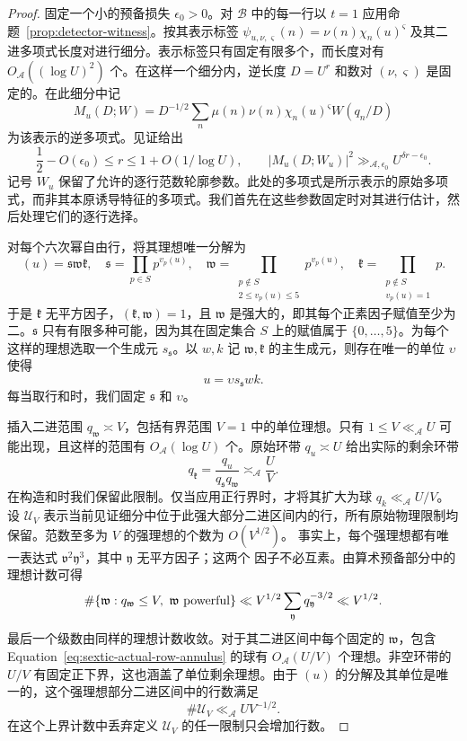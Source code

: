 \documentclass[11pt,a4paper]{article}
\numberwithin{equation}{section}
\numberwithin{figure}{section}
\theoremstyle{definition}
\theoremstyle{remark}
\begin{document}
\begin{proof}
固定一个小的预备损失 $\epsilon_0>0$。对 $\mathcal B$ 中的每一行以 $t=1$ 应用命题~\ref{prop:detector-witness}。按其表示标签 $\psi_{u,\nu,\varsigma}(n)=\nu(n)\chi_n(u)^{\varsigma}$ 及其二进多项式长度对进行细分。表示标签只有固定有限多个，而长度对有 $O_{\mathcal A}((\log U)^2)$ 个。在这样一个细分内，逆长度 $D=U^r$ 和数对 $(\nu,\varsigma)$ 是固定的。在此细分中记
\[
 M_u(D;W)=D^{-1/2}\sum_n\mu(n)\nu(n)\chi_n(u)^{\varsigma}W(q_n/D)
\]
为该表示的逆多项式。见证给出
\begin{equation}\label{eq:sextic-witness-spike}
 \frac12-O(\epsilon_0)\le r\le1+O(1/\log U),
 \qquad |M_u(D;W_u)|^2\gg_{\mathcal A,\epsilon_0}
       U^{\delta r-\epsilon_0}.
\end{equation}
记号 $W_u$ 保留了允许的逐行范数轮廓参数。此处的多项式是所示表示的原始多项式，而非其本原诱导特征的多项式。我们首先在这些参数固定时对其进行估计，然后处理它们的逐行选择。

对每个六次幂自由行，将其理想唯一分解为
\[
 (u)=\mathfrak s\mathfrak w\mathfrak k,
 \quad
 \mathfrak s=\prod_{p\in S}p^{v_p(u)},\quad
 \mathfrak w=\prod_{\substack{p\notin S\\2\le v_p(u)\le5}}p^{v_p(u)},
 \quad
 \mathfrak k=\prod_{\substack{p\notin S\\v_p(u)=1}}p.
\]
于是 $\mathfrak k$ 无平方因子，$(\mathfrak k,\mathfrak w)=1$，且 $\mathfrak w$ 是强大的，即其每个正素因子赋值至少为二。$\mathfrak s$ 只有有限多种可能，因为其在固定集合 $S$ 上的赋值属于 $\{0,\ldots,5\}$。为每个这样的理想选取一个生成元 $s_{\mathfrak s}$。以 $w,k$ 记 $\mathfrak w,\mathfrak k$ 的主生成元，则存在唯一的单位 $\upsilon$ 使得
\[
 u=\upsilon s_{\mathfrak s}wk.
\]
每当取行和时，我们固定 $\mathfrak s$ 和 $\upsilon$。

插入二进范围 $q_{\mathfrak w}\asymp V$，包括有界范围 $V=1$ 中的单位理想。只有 $1\le V\ll_{\mathcal A}U$ 可能出现，且这样的范围有 $O_{\mathcal A}(\log U)$ 个。原始环带 $q_u\asymp U$ 给出实际的剩余环带
\begin{equation}\label{eq:sextic-actual-row-annulus}
 q_{\mathfrak k}=\frac{q_u}{q_{\mathfrak s}q_{\mathfrak w}}
       \asymp_{\mathcal A}\frac UV.
\end{equation}
在构造和时我们保留此限制。仅当应用正行界时，才将其扩大为球 $q_k\ll_{\mathcal A}U/V$。设 $\mathcal U_V$ 表示当前见证细分中位于此强大部分二进区间内的行，所有原始物理限制均保留。范数至多为 $V$ 的强理想的个数为 $O(V^{1/2})$。
事实上，每个强理想都有唯一表达式
$\mathfrak v^2\mathfrak y^3$，其中 $\mathfrak y$ 无平方因子；这两个
因子不必互素。由算术预备部分中的理想计数可得
\[
 \#\{\mathfrak w:q_{\mathfrak w}\le V,\ \mathfrak w\ {\rm powerful}\}
 \ll V^{1/2}\sum_{\mathfrak y}q_{\mathfrak y}^{-3/2}
 \ll V^{1/2}.
\]
最后一个级数由同样的理想计数收敛。对于其二进区间中每个固定的
$\mathfrak w$，包含
Equation~\eqref{eq:sextic-actual-row-annulus} 的球有 $O_{\mathcal A}(U/V)$
个理想。非空环带的 $U/V$ 有固定正下界，这也涵盖了单位剩余理想。由于
$(u)$ 的分解及其单位是唯一的，这个强理想部分二进区间中的行数满足
\begin{equation}\label{eq:sextic-stratum-cardinality}
 \#\mathcal U_V\ll_{\mathcal A}U V^{-1/2}.
\end{equation}
在这个上界计数中丢弃定义 $\mathcal U_V$ 的任一限制只会增加行数。


\end{proof}
\end{document}
